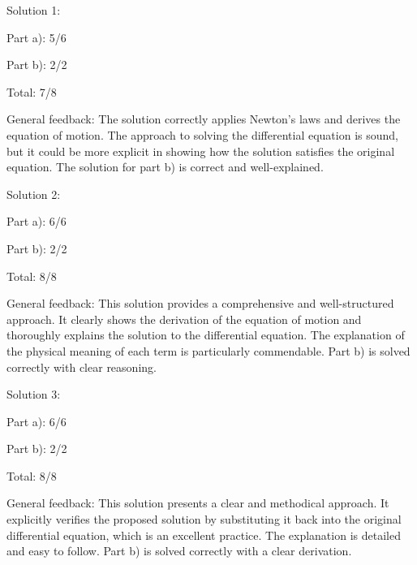 \documentclass[a4paper,11pt]{article}
\begin{document}
Solution 1:

Part a): 5/6

Part b): 2/2

Total: 7/8

General feedback: The solution correctly applies Newton's laws and derives the equation of motion. The approach to solving the differential equation is sound, but it could be more explicit in showing how the solution satisfies the original equation. The solution for part b) is correct and well-explained.

Solution 2:

Part a): 6/6

Part b): 2/2

Total: 8/8

General feedback: This solution provides a comprehensive and well-structured approach. It clearly shows the derivation of the equation of motion and thoroughly explains the solution to the differential equation. The explanation of the physical meaning of each term is particularly commendable. Part b) is solved correctly with clear reasoning.

Solution 3:

Part a): 6/6

Part b): 2/2

Total: 8/8

General feedback: This solution presents a clear and methodical approach. It explicitly verifies the proposed solution by substituting it back into the original differential equation, which is an excellent practice. The explanation is detailed and easy to follow. Part b) is solved correctly with a clear derivation.
\end{document}
